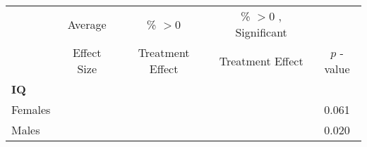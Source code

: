 \begin{tabular}{l c c c c}
\toprule
 & Average & \% $ >0 $ & \% $ >0 $ , Significant & \citet{Rosenbaum_2005_Distribution_JRSS} \\
 & Effect Size & Treatment Effect & Treatment Effect & $ p $ -value \\
\midrule
\textbf{IQ} & & & & \\
\quad Females &   &  &  &     0.061 \\
\quad Males &   &  &  &     0.020 \\
\midrule
\bottomrule
\end{tabular}
